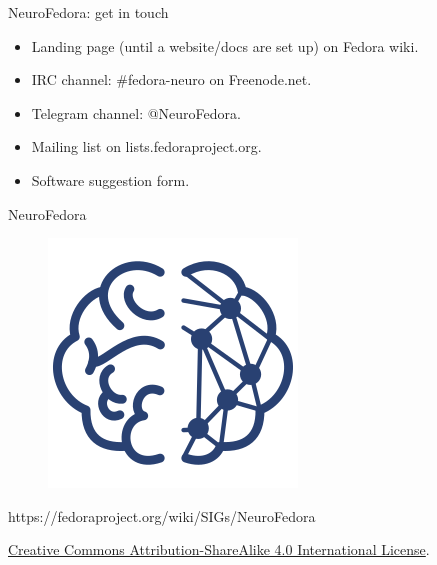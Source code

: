 \begin{frame}[c]{NeuroFedora: get in touch}
  \begin{itemize}
    \item Landing page (until a website/docs are set up) on Fedora wiki\footnotemark.
    \item IRC channel: \#fedora-neuro on Freenode.net\footnotemark.
    \item Telegram channel: @NeuroFedora\footnotemark.
    \item Mailing list on lists.fedoraproject.org\footnotemark.
    \item Software suggestion form\footnotemark.
  \end{itemize}
\end{frame}
\begin{frame}[c]{NeuroFedora}
  \begin{figure}[h]
    \centering
    \includegraphics[keepaspectratio,height=0.5\textheight]{images/NeuroFedoraLogo01.png}
  \end{figure}
  \begin{center}
    https://fedoraproject.org/wiki/SIGs/NeuroFedora\vspace{0.2cm}

    \href{http://creativecommons.org/licenses/by-sa/4.0/}{Creative Commons Attribution-ShareAlike 4.0 International License}.\vspace{0.2cm}

    \ccbysa{}
  \end{center}
\end{frame}

